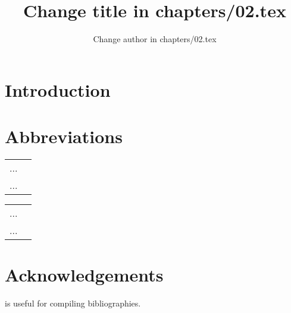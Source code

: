 \documentclass[output=paper]{langscibook}
\author{Change author in chapters/02.tex}
\title{Change title in chapters/02.tex}
\begin{document}
\maketitle

\section{Introduction}
 
 
\section*{Abbreviations}
\begin{tabularx}{.45\textwidth}{lQ}
... & \\
... & \\
\end{tabularx}
\begin{tabularx}{.45\textwidth}{lQ}
... & \\
... & \\
\end{tabularx}


\section*{Acknowledgements}
\citet{Nordhoff2018} is useful for compiling bibliographies.

{\sloppy\printbibliography[heading=subbibliography,notkeyword=this]}
\end{document}
